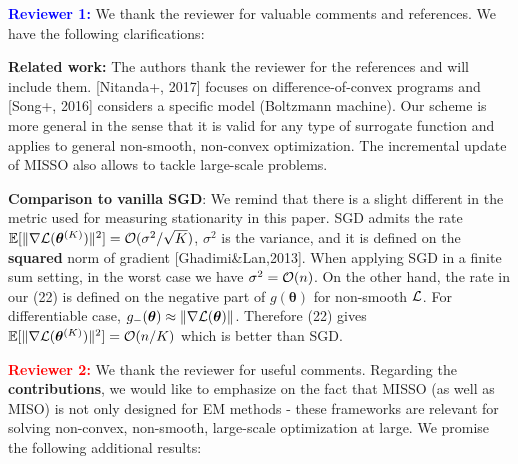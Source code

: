 \documentclass{article}
\begin{document}


\textbf{\textcolor{blue}{Reviewer 1:}} We thank the reviewer for valuable comments and references. We have the following clarifications:

\textbf{Related work:} The authors thank the reviewer for the references and will include them. 
[Nitanda+, 2017] focuses on difference-of-convex programs and [Song+, 2016] considers a specific model (Boltzmann machine). Our scheme is more general in the sense that it is valid for any type of surrogate function and applies to general non-smooth, non-convex optimization.
The incremental update of MISSO also allows to tackle large-scale problems.

\textbf{Comparison to vanilla SGD}: We remind  that there is a slight different in the metric used for measuring stationarity in this paper. SGD admits the rate $\mathbb{E}[ \| \nabla {\cal L}( \bm{\theta}^{(K)} )\|^2 ] = {\cal O}(\sigma^2/\sqrt{K})$, $\sigma^2$ is the variance, and it is defined on the \textbf{squared} norm of gradient [Ghadimi\&Lan,2013]. When applying SGD in a finite sum setting, in the worst case we have $\sigma^2 = {\cal O}(n)$. On the other hand, the rate in our (22) is defined on the negative part of $g(\bm{\theta})$ for non-smooth ${\cal L}$. For differentiable case,  $g_-(\bm{\theta}) \approx \| \nabla {\cal L}( \bm{\theta}) \|$. Therefore (22) gives $\mathbb{E}[ \| \nabla {\cal L}( \bm{\theta}^{(K)} )\|^2 ] = {\cal O}(n/K)$ which is better than SGD. 


\textbf{\textcolor{red}{Reviewer 2:}} We thank the reviewer for useful comments.
Regarding the \textbf{contributions}, we would like to emphasize on the fact that MISSO (as well as MISO) is not only designed for EM methods - these frameworks are relevant for solving non-convex, non-smooth, large-scale optimization at large. We promise the following additional results:
\end{document}
